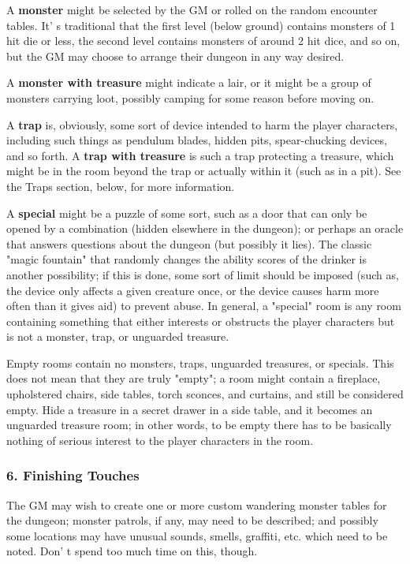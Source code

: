 \documentclass[a4paper,twoside,openany,10pt]{book}
\begin{document}
\begin{multicols}{2}
A \textbf{monster} might be selected by the GM or rolled on the random encounter tables. It' s traditional that the first level (below ground) contains monsters of 1 hit die or less, the second level contains monsters of around 2 hit dice, and so on, but the GM may choose to arrange their dungeon in any way desired.

A \textbf{monster with treasure} might indicate a lair, or it might be a group of monsters carrying loot, possibly camping for some reason before moving on. 

A \textbf{trap} is, obviously, some sort of device intended to harm the player characters, including such things as pendulum blades, hidden pits, spear-chucking devices, and so forth. A \textbf{trap with treasure} is such a trap protecting a treasure, which might be in the room beyond the trap or actually within it (such as in a pit). See the Traps section, below, for more information.

A \textbf{special} might be a puzzle of some sort, such as a door that can only be opened by a combination (hidden elsewhere in the dungeon); or perhaps an oracle that answers questions about the dungeon (but possibly it lies). The classic "magic fountain" that randomly changes the ability scores of the drinker is another possibility; if this is done, some sort of limit should be imposed (such as, the device only affects a given creature once, or the device causes harm more often than it gives aid) to prevent abuse. In general, a "special" room is any room containing something that either interests or obstructs the player characters but is not a monster, trap, or unguarded treasure.

Empty rooms contain no monsters, traps, unguarded treasures, or specials. This does not mean that they are truly "empty"; a room might contain a fireplace, upholstered chairs, side tables, torch sconces, and curtains, and still be considered empty. Hide a treasure in a secret drawer in a side table, and it becomes an unguarded treasure room; in other words, to be empty there has to be basically nothing of serious interest to the player characters in the room.


\subsubsection{6. Finishing Touches}\label{finishing-touches}

The GM may wish to create one or more custom wandering monster tables for the dungeon; monster patrols, if any, may need to be described; and possibly some locations may have unusual sounds, smells, graffiti, etc. which need to be noted. Don' t spend too much time on this, though.


\end{multicols}
\end{document}

